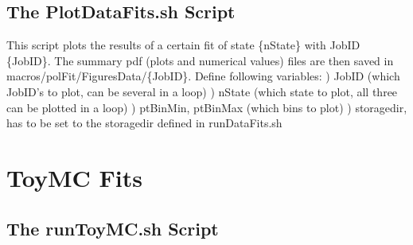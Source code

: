 \documentclass{article}
\begin{document}
\subsection{The PlotDataFits.sh Script}

This script plots the results of a certain fit of state \{nState\} with JobID \{JobID\}. The summary pdf (plots and numerical values) files are then saved in macros/polFit/FiguresData/\{JobID\}. Define following variables:
\newline *) JobID (which JobID's to plot, can be several in a loop)
\newline *) nState (which state to plot, all three can be plotted in a loop)
\newline *) ptBinMin, ptBinMax (which bins to plot)
\newline *) storagedir, has to be set to the storagedir defined in runDataFits.sh

\section{ToyMC Fits}

\subsection{The runToyMC.sh Script}
\end{document}
